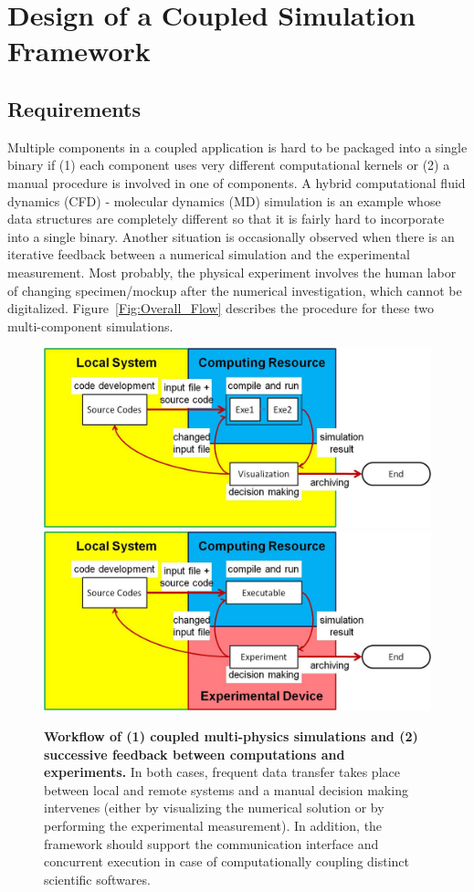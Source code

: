 \documentclass[10pt,conference]{IEEEtran}
\begin{document}
\section{Design of a Coupled Simulation Framework}
\label{sec:design}

\subsection{Requirements}
Multiple components in a coupled application is hard to be packaged 
into a single binary if 
(1) each component uses very different computational kernels 
or 
(2) a manual procedure is involved in one of components.
A hybrid computational fluid dynamics (CFD) - molecular dynamics (MD) 
simulation is an example whose data structures are completely different
so that it is fairly hard to incorporate into a single binary.
Another situation is occasionally observed when there is an iterative
feedback between a numerical simulation and the experimental measurement.
Most probably, the physical experiment involves the human labor
of changing specimen/mockup after the numerical investigation, 
which cannot be digitalized.
Figure~\ref{Fig:Overall_Flow} describes the procedure for 
these two multi-component simulations.


\begin{figure}[ht]
\centering
\includegraphics[width=0.8\linewidth]{Flow_Multiphysics_Simulation.jpg}
\vskip-0.2cm
\includegraphics[width=0.8\linewidth]{Flow_Exp_and_Comp.jpg}
\vskip-0.2cm
\caption{\small {\bf Workflow of (1) coupled multi-physics simulations and (2) successive feedback between computations and experiments.} In both cases, frequent data transfer takes place between local and remote systems and a manual decision making intervenes (either by visualizing the numerical solution or by performing the experimental measurement). In addition, the framework should support the communication interface and concurrent execution in case of computationally coupling distinct scientific softwares.}
\label{Overall_Flow}
\end{figure}
\end{document}

